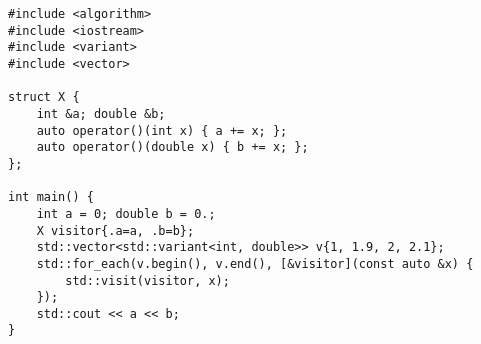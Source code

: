 \begin{lstlisting}[title=\href{https://godbolt.org/z/RknsuT}{\texttt{godbolt.org/z/RknsuT}}]
#include <algorithm>
#include <iostream>
#include <variant>
#include <vector>

struct X {
    int &a; double &b;
    auto operator()(int x) { a += x; };
    auto operator()(double x) { b += x; };
};

int main() {
    int a = 0; double b = 0.;
    X visitor{.a=a, .b=b};
    std::vector<std::variant<int, double>> v{1, 1.9, 2, 2.1};
    std::for_each(v.begin(), v.end(), [&visitor](const auto &x) {
        std::visit(visitor, x);
    });
    std::cout << a << b;
}
\end{lstlisting}
